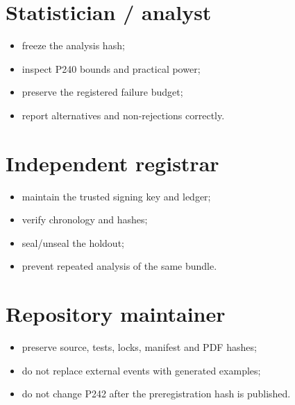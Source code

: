\documentclass[11pt,a4paper,openany]{report}
\begin{document}
\section{Statistician /\allowbreak{} analyst}

\begin{itemize}
\item 
freeze the analysis hash;

\item 
inspect P240 bounds and practical power;

\item 
preserve the registered failure budget;

\item 
report alternatives and non-rejections correctly.

\end{itemize}

\section{Independent registrar}

\begin{itemize}
\item 
maintain the trusted signing key and ledger;

\item 
verify chronology and hashes;

\item 
seal/\allowbreak{}unseal the holdout;

\item 
prevent repeated analysis of the same bundle.

\end{itemize}

\section{Repository maintainer}

\begin{itemize}
\item 
preserve source, tests, locks, manifest and PDF hashes;

\item 
do not replace external events with generated examples;

\item 
do not change P242 after the preregistration hash is published.

\end{itemize}
\end{document}
